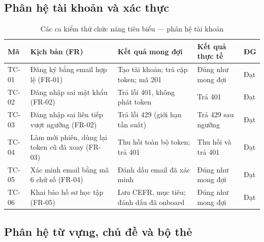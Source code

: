 \subsection{Phân hệ tài khoản và xác thực}
\label{subsec:tc-auth}

\begin{table}[h]
  \centering
  \small
  \renewcommand{\arraystretch}{1.25}
  \begin{tabular}{|p{1.0cm}|p{3.3cm}|p{4.2cm}|p{4.2cm}|p{0.9cm}|}
    \hline
    \textbf{Mã} & \textbf{Kịch bản (FR)} & \textbf{Kết quả mong đợi} & \textbf{Kết quả thực tế} & \textbf{ĐG} \\
    \hline
    TC-01 & Đăng ký bằng email hợp lệ (FR-01) & Tạo tài khoản; trả cặp token; mã 201 & Đúng như mong đợi & Đạt \\
    \hline
    TC-02 & Đăng nhập sai mật khẩu (FR-02) & Trả lỗi 401, không phát token & Trả 401 & Đạt \\
    \hline
    TC-03 & Đăng nhập sai liên tiếp vượt ngưỡng (FR-02) & Trả lỗi 429 (giới hạn tần suất) & Trả 429 sau ngưỡng & Đạt \\
    \hline
    TC-04 & Làm mới phiên, dùng lại token cũ đã xoay (FR-03) & Thu hồi toàn bộ token; trả 401 & Thu hồi và trả 401 & Đạt \\
    \hline
    TC-05 & Xác minh email bằng mã 6 chữ số (FR-04) & Đánh dấu email đã xác minh & Đúng như mong đợi & Đạt \\
    \hline
    TC-06 & Khai báo hồ sơ học tập (FR-05) & Lưu CEFR, mục tiêu; đánh dấu đã onboard & Đúng như mong đợi & Đạt \\
    \hline
  \end{tabular}
  \caption{Các ca kiểm thử chức năng tiêu biểu --- phân hệ tài khoản}
  \label{tab:tc-auth}
\end{table}

\subsection{Phân hệ từ vựng, chủ đề và bộ thẻ}
\label{subsec:tc-vocab}

